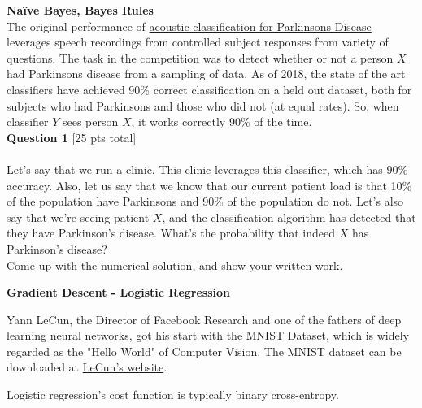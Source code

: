 \documentclass[paper=a4, fontsize=11pt]{scrartcl} %
\author{
    \textbf{YOUR NAME} \\ 
    \textbf{YOUR GIT USERNAME} \\ 
    \textbf{YOUR E-MAIL}
}%
\begin{document}
\maketitle %

{\huge \textbf{Na\"ive Bayes, Bayes Rules}} \\

The original performance of \href{https://www.ncbi.nlm.nih.gov/pmc/articles/PMC6339026/}{acoustic classification for Parkinsons Disease} leverages speech recordings from controlled subject responses from variety of questions. The task in the competition was to detect whether or not a person $X$ had Parkinsons disease from a sampling of data. As of 2018, the state of the art classifiers have achieved 90\% correct classification on a held out dataset, both for subjects who had Parkinsons and those who did not (at equal rates). So, when classifier $Y$ sees person $X$, it works correctly 90\% of the time. \\

{\Large \textbf{Question 1} [25 pts total]} \\
\\
Let's say that we run a clinic. This clinic leverages this classifier, which has 90\% accuracy. Also, let us say that we know that our current patient load is that 10\% of the population have Parkinsons and 90\% of the population do not. Let's also say that we're seeing patient $X$, and the classification algorithm has detected that they have Parkinson's disease. What's the probability that indeed $X$ has Parkinson's disease? \\

Come up with the numerical solution, and show your written work.

\vspace{1.5cm}
{\huge \textbf{Gradient Descent - Logistic Regression}}
\vspace{3mm}

Yann LeCun, the Director of Facebook Research and one of the fathers of deep learning neural networks, got his start with the MNIST Dataset, which is widely regarded as the "Hello World" of Computer Vision. The MNIST dataset can be downloaded at \href{http://yann.lecun.com/exdb/mnist/}{LeCun's website}.

Logistic regression's cost function is typically binary cross-entropy.
\end{document}
